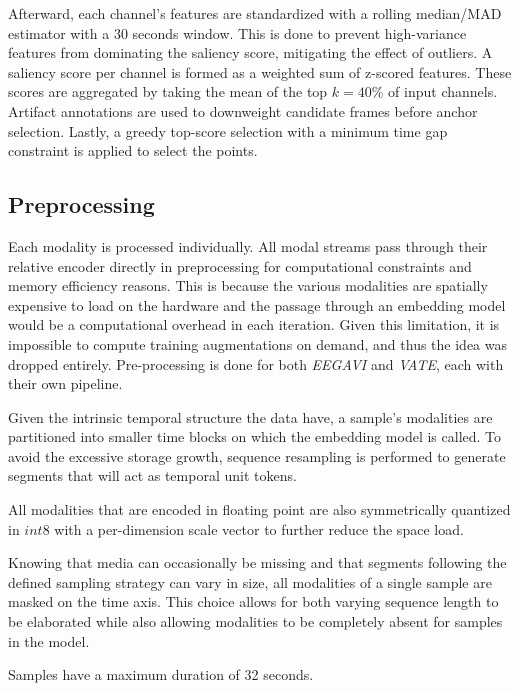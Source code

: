 Afterward, each channel's features are standardized with a rolling median/MAD estimator with a 30 seconds window.
This is done to prevent high-variance features from dominating the saliency score, mitigating the effect of outliers.
A saliency score per channel is formed as a weighted sum of z-scored features.
These scores are aggregated by taking the mean of the top $k=40\% $ of input channels.
Artifact annotations are used to downweight candidate frames before anchor selection.
Lastly, a greedy top-score selection with a minimum time gap constraint is applied to select the points.

\subsection{Preprocessing}
Each modality is processed individually.
All modal streams pass through their relative encoder directly in preprocessing for computational constraints and memory efficiency reasons.
This is because the various modalities are spatially expensive to load on the hardware and the passage through an embedding model would be a computational overhead in each iteration.
Given this limitation, it is impossible to compute training augmentations on demand, and thus the idea was dropped entirely.
Pre-processing is done for both \textit{EEGAVI} and \textit{VATE}, each with their own pipeline.

Given the intrinsic temporal structure the data have, a sample's modalities are partitioned into smaller time blocks on which the embedding model is called.
To avoid the excessive storage growth, sequence resampling is performed to generate segments that will act as temporal unit tokens.

All modalities that are encoded in floating point are also symmetrically quantized in $int8$ with a per-dimension scale vector to further reduce the space load.

Knowing that media can occasionally be missing and that segments following the defined sampling strategy can vary in size, all modalities of a single sample are masked on the time axis.
This choice allows for both varying sequence length to be elaborated while also allowing modalities to be completely absent for samples in the model.

Samples have a maximum duration of 32 seconds.


